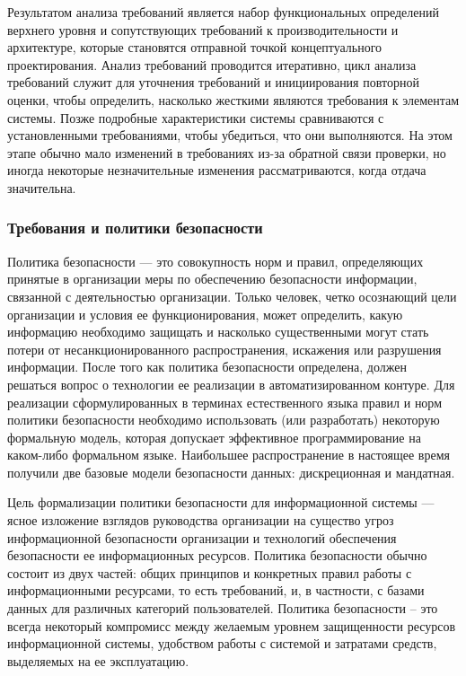 Результатом анализа требований является набор функциональных определений верхнего уровня и сопутствующих требований
к производительности и архитектуре, которые становятся отправной точкой концептуального проектирования. Анализ
требований проводится итеративно, цикл анализа требований служит для уточнения требований и инициирования
повторной оценки, чтобы определить, насколько жесткими являются требования к элементам системы. Позже подробные
характеристики системы сравниваются с установленными требованиями, чтобы убедиться, что они выполняются.
На этом этапе обычно мало изменений в требованиях из-за обратной связи проверки, но иногда некоторые незначительные
изменения рассматриваются, когда отдача значительна.

\subsubsection{Требования и политики безопасности}

Политика безопасности — это совокупность норм и правил, определяющих принятые в организации меры по обеспечению
безопасности информации, связанной с деятельностью организации. Только человек, четко осознающий цели организации
и условия ее функционирования, может определить, какую информацию необходимо защищать и насколько существенными
могут стать потери от несанкционированного распространения, искажения или разрушения информации. После того как
политика безопасности определена, должен решаться вопрос о технологии ее реализации в автоматизированном контуре.
Для реализации сформулированных в терминах естественного языка правил и норм политики безопасности необходимо
использовать (или разработать) некоторую формальную модель, которая допускает эффективное программирование на
каком-либо формальном языке. Наибольшее распространение в настоящее время получили две базовые модели безопасности
данных: дискреционная и мандатная.

Цель формализации политики безопасности для информационной системы — ясное изложение взглядов руководства
организации на существо угроз информационной безопасности организации и технологий обеспечения безопасности ее
информационных ресурсов. Политика безопасности обычно состоит из двух частей: общих принципов и конкретных правил
работы с информационными ресурсами, то есть требований, и, в частности, с базами данных для различных категорий
пользователей. Политика безопасности – это всегда некоторый компромисс между желаемым уровнем защищенности ресурсов
информационной системы, удобством работы с системой и затратами средств, выделяемых на ее эксплуатацию.

